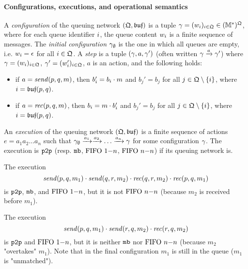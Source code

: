 \paragraph{\bf Configurations, executions, and operational semantics}
A \emph{configuration} of the queuing network $(\mathfrak{Q},\mathfrak{buf})$ is 
a tuple $\gamma=(w_{i})_{i\in\mathfrak{Q}}\in (\mathbb{M}^*)^{\mathfrak{Q}}$,
where for each queue identifier $i$, the queue content $w_{i}$ is a finite sequence of messages.
The \emph{initial configuration} $\gamma_{\emptyset}$ is the one in which all queues are empty, i.e. 
$w_{i}=\epsilon$ for all $i\in\mathfrak{Q}$.
A \emph{step} is a tuple $(\gamma,a,\gamma')$ (often written $\gamma\xrightarrow{a}\gamma'$)
where $\gamma=(w_{i})_{i\in\mathfrak{Q}}$,
$\gamma'=(w_{i}')_{i\in\mathfrak{Q}}$, 
$a$ is an action, and the following holds:
\begin{itemize}
  \item if $a=\mathit{send}(p, q, m)$, then $b'_{i}=b_{i}\cdot m$
  and $b_j'=b_j$ for all $j\in \mathfrak{Q}\setminus\{i\}$, 
  where $i=\mathfrak{buf}(p,q)$.
  \item if $a=\mathit{rec}(p, q, m)$, then $b_{i}=m\cdot b'_{i}$
  and $b_j'=b_j$ for all $j\in \mathfrak{Q}\setminus\{i\}$, 
  where $i=\mathfrak{buf}(p,q)$.
\end{itemize}
An \emph{execution} of the queuing network $(\mathfrak{Q},\mathfrak{buf})$
is a finite sequence of actions $e=a_1a_2\ldots a_n$ such that
$\gamma_{\emptyset}\xrightarrow{a_1}\xrightarrow{a_2}\ldots\xrightarrow{a_n}\gamma$ for some configuration $\gamma$.
The execution is $\mathtt{p2p}$ (resp. $\mathtt{mb}$, $\text{FIFO } 1\mathsf{-}n$, $\text{FIFO } n\mathsf{-}n$) if its queuing network is.

\begin{example}
The execution 
$$
\mathit{send}(p, q, m_1)\cdot\mathit{send}(q, r, m_2)\cdot\mathit{rec}(q, r, m_2)\cdot\mathit{rec}(p, q, m_1)
$$
is $\mathtt{p2p}$, $\mathtt{mb}$, and $\text{FIFO } 1\mathsf{-}n$, but it is not $\text{FIFO } n\mathsf{-}n$ (because $m_2$ is received before $m_1$). 
\end{example}

\begin{example}
    The execution 
    $$
    \mathit{send}(p, q, m_1)\cdot\mathit{send}(r, q, m_2)\cdot\mathit{rec}(r, q, m_2)
    $$
    is $\mathtt{p2p}$ and $\text{FIFO } 1\mathsf{-}n$, but it is neither $\mathtt{mb}$ nor $\text{FIFO } n\mathsf{-}n$ (because $m_2$ "overtakes" $m_1$). Note that in the
    final configuration $m_1$ is still in the queue ($m_1$ is "unmatched"). 
\end{example}
    


